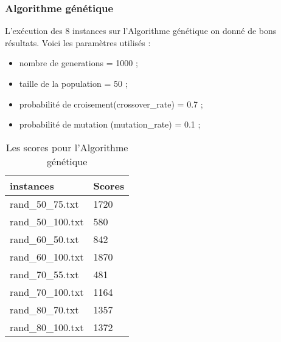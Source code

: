 \subsubsection{Algorithme génétique}
L'exécution des 8 instances sur l'Algorithme génétique on donné de bons résultats. Voici les paramètres utilisés : 
\begin{itemize}
	\item  nombre de generations = 1000 ; 
	\item  taille de la population = 50 ;
	 \item probabilité de croisement(crossover\_rate) = 0.7 ; 
	\item   probabilité de mutation (mutation\_rate) = 0.1 ;  
\end{itemize}

	\begin{table}[H]
	\centering
	\caption{Les scores pour l'Algorithme génétique}
	\begin{tabular}[t]
		{m{}m{}}
		\toprule
		instances &	Scores  \\
		
		\midrule
		rand\_50\_75.txt& 1720	\\
		rand\_50\_100.txt& 580	\\
		rand\_60\_50.txt& 842	\\
		rand\_60\_100.txt& 1870	\\
		rand\_70\_55.txt&	481\\
		rand\_70\_100.txt&	1164\\
		rand\_80\_70.txt&1357	\\
		rand\_80\_100.txt&	1372\\
		
		
		\bottomrule
	\end{tabular}
\end{table}
